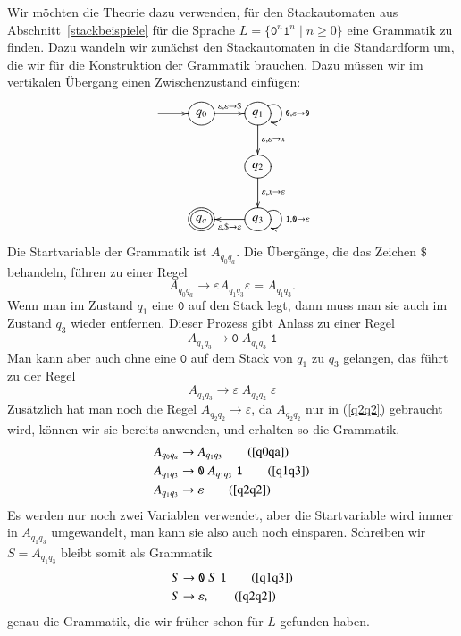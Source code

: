 \begin{beispiel}
Wir möchten die Theorie dazu verwenden, für den Stackautomaten aus
Abschnitt~\ref{stackbeispiele} für die Sprache
$L=\{\texttt{0}^n\texttt{1}^n\;|\; n\ge 0\}$ eine Grammatik zu finden.
Dazu wandeln wir zunächst den Stackautomaten in die Standardform um, die
wir für die Konstruktion der Grammatik brauchen. Dazu müssen wir
im vertikalen Übergang einen Zwischenzustand einfügen:
\[
\entrymodifiers={++[o][F]}
\xymatrix{
*+\txt{}\ar[r]
	&{q_0}\ar[r]^{\varepsilon,\varepsilon\to{\tt \$}}
		&{q_1} \ar@(ur,dr)^{{\tt 0},\varepsilon\to{\tt 0}}
		    \ar[d]^{\varepsilon,\varepsilon\to x}
\\
*+\txt{}
	&*+\txt{}
		&{q_2}\ar[d]^{\varepsilon,x\to\varepsilon}
\\
*+\txt{}
	&*++[o][F=]{q_a}
		&{q_3}\ar[l]^{\varepsilon,{\tt \$}\to\varepsilon}
		   \ar@(ur,dr)^{{\tt 1},{\tt 0}\to\varepsilon}
}
\]
Die Startvariable der Grammatik ist $A_{q_0q_a}$. Die Übergänge, die
das Zeichen $\texttt{\$}$ behandeln, führen zu einer Regel
\begin{equation}
A_{q_0q_a}\to \varepsilon A_{q_1q_3}\varepsilon = A_{q_1q_3}.
\label{q0qa}
\end{equation}
Wenn man im Zustand $q_1$ eine $\texttt{0}$ auf den Stack legt, dann
muss man sie auch im Zustand $q_3$ wieder entfernen. Dieser Prozess
gibt Anlass zu einer Regel
\begin{equation}
A_{q_1q_3}\to \texttt{0}\; A_{q_1q_3}\;\texttt{1}
\label{q1q3}
\end{equation}
Man kann aber auch ohne eine $\texttt{0}$ auf dem Stack von
$q_1$ zu $q_3$ gelangen, das führt zu der Regel 
\begin{equation}
A_{q_1q_3}\to \varepsilon\; A_{q_2q_2}\;\varepsilon
\label{q2q2}
\end{equation}
Zusätzlich hat man noch die Regel $A_{q_2q_2}\to\varepsilon$, da 
$A_{q_2q_2}$ nur in (\ref{q2q2}) gebraucht wird, können wir sie
bereits anwenden, und erhalten so die Grammatik.
\begin{align}
A_{q_0q_a}&\to A_{q_1q_3} \tag{\ref{q0qa}}\\
A_{q_1q_3}&\to \texttt{0}\; A_{q_1q_3}\;\texttt{1} \tag{\ref{q1q3}}\\
A_{q_1q_3}&\to \varepsilon\tag{\ref{q2q2}}
\end{align}
Es werden nur noch zwei Variablen verwendet, aber die Startvariable
wird immer in $A_{q_1q_3}$ umgewandelt, man kann sie also auch noch
einsparen. Schreiben wir $S=A_{q_1q_3}$ bleibt somit als
Grammatik
\begin{align}
S&\to \texttt{0}\; S\; \texttt{1}\tag{\ref{q1q3}}\\
S&\to\varepsilon,\tag{\ref{q2q2}}
\end{align}
genau die Grammatik, die wir früher schon für $L$ gefunden haben.
\end{beispiel}

